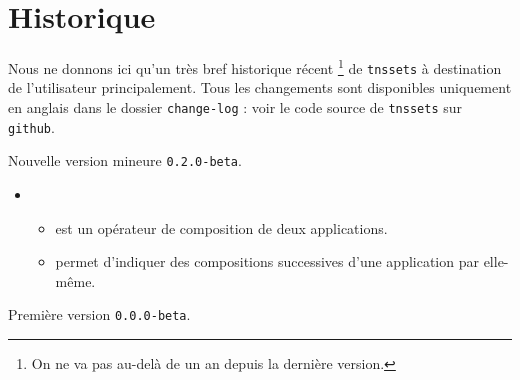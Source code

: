 \documentclass[12pt,a4paper]{article}
\begin{document}
\newpage

\section{Historique}

Nous ne donnons ici qu'un très bref historique récent
\footnote{
	On ne va pas au-delà de un an depuis la dernière version.
}
de \verb+tnssets+ à destination de l'utilisateur principalement.
Tous les changements sont disponibles uniquement en anglais dans le dossier \verb+change-log+ : voir le code source de \verb+tnssets+ sur \verb+github+.

\begin{description}

    \medskip
    \item[2020-07-30] Nouvelle version mineure \verb+0.2.0-beta+.
    
    \begin{itemize}[itemsep=.5em]
        \item {}
        \begin{itemize}[itemsep=.5em]
            \item {} est un opérateur de composition de deux applications.
    
            \item {} permet d'indiquer des compositions successives d'une application par elle-même.
        \end{itemize}
    
    
    
    
    
        \separation
    \end{itemize}
    


    \medskip
    \item[2020-07-10] Première version \verb+0.0.0-beta+.

\end{description}
\end{document}
